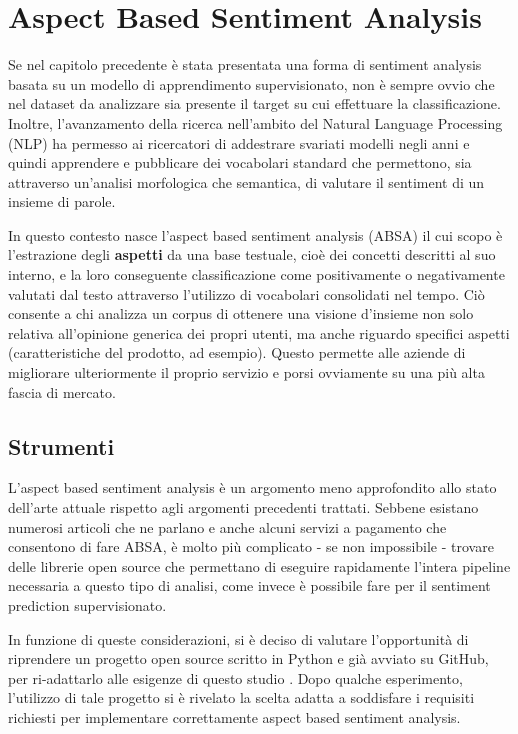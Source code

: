 \documentclass[hidelinks, 12pt]{article}
\begin{document}
\clearpage



\section{Aspect Based Sentiment Analysis}
\label{sec:absa}


Se nel capitolo precedente è stata presentata una forma di sentiment analysis basata su un modello di apprendimento supervisionato, non è sempre ovvio che nel dataset da analizzare sia presente il target su cui effettuare la classificazione. Inoltre, l'avanzamento della ricerca nell'ambito del Natural Language Processing (NLP) ha permesso ai ricercatori di addestrare svariati modelli negli anni e quindi apprendere e pubblicare dei vocabolari standard che permettono, sia attraverso un'analisi morfologica che semantica, di valutare il sentiment di un insieme di parole.

In questo contesto nasce l'aspect based sentiment analysis (ABSA) il cui scopo è l'estrazione degli \textbf{aspetti} da una base testuale, cioè dei concetti descritti al suo interno, e la loro conseguente classificazione come positivamente o negativamente valutati dal testo attraverso l'utilizzo di vocabolari consolidati nel tempo. Ciò consente a chi analizza un corpus di ottenere una visione d'insieme non solo relativa all'opinione generica dei propri utenti, ma anche riguardo specifici aspetti (caratteristiche del prodotto, ad esempio). Questo permette alle aziende di migliorare ulteriormente il proprio servizio e porsi ovviamente su una più alta fascia di mercato.



\subsection{Strumenti}

L'aspect based sentiment analysis è un argomento meno approfondito allo stato dell'arte attuale rispetto agli argomenti precedenti trattati. Sebbene esistano numerosi articoli che ne parlano e anche alcuni servizi a pagamento che consentono di fare ABSA, è molto più complicato - se non impossibile - trovare delle librerie open source che permettano di eseguire rapidamente l'intera pipeline necessaria a questo tipo di analisi, come invece è possibile fare per il sentiment prediction supervisionato.

In funzione di queste considerazioni, si è deciso di valutare l'opportunità di riprendere un progetto open source scritto in Python e già avviato su GitHub, per ri-adattarlo alle esigenze di questo studio \cite{site:jonm01-absa}. Dopo qualche esperimento, l'utilizzo di tale progetto si è rivelato la scelta adatta a soddisfare i requisiti richiesti per implementare correttamente aspect based sentiment analysis.
\end{document}
